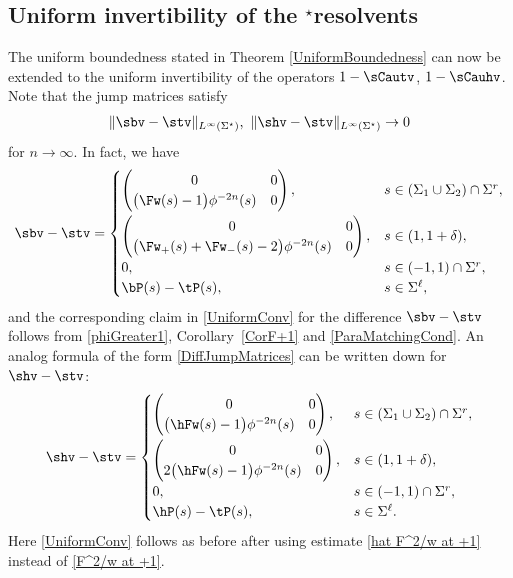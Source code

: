 \subsection[Uniform invertibility of the star resolvents]{Uniform invertibility of the $\boldsymbol{{}^\star}$resolvents}\label{Comparison}
The uniform boundedness stated in Theorem \ref{UniformBoundedness} can now be extended to the uniform invertibility of the operators $1-\sCautv$, $1-\sCauhv$. Note that the jump matrices satisfy
\begin{align}\label{UniformConv}
\Vert \sbv - \stv \Vert_{L^\infty(\Sigma^\star)}, \ \Vert \shv - \stv \Vert_{L^\infty(\Sigma^\star)} \to 0
\end{align}
for $n \to \infty$. In fact, we have
\begin{align}
 \sbv - \stv =
 \begin{cases}
 \begin{pmatrix}
 0 & 0
 \\
 \big(\Fw(s)-1\big)\phi^{-2n}(s) & 0
 \end{pmatrix}, & s\in (\Sigma_1 \cup \Sigma_2)\cap\Sigma^r,\vspace{1mm}
 \\
 \begin{pmatrix}
 0 & 0
 \\
 \big(\Fw_+(s) +\Fw_-(s)-2\big)\phi^{-2n}(s) & 0
 \end{pmatrix}, & s\in (1,1+\delta),
 \\
 0, & s\in(-1,1)\cap \Sigma^r,
 \\
 \bP(s)-\tP(s), & s\in\Sigma^\ell,
 \end{cases}\label{DiffJumpMatrices}
\end{align}
and the corresponding claim in \eqref{UniformConv} for the difference $\sbv - \stv$ follows from \eqref{phiGreater1}, Corollary~\ref{CorF+1} and \eqref{ParaMatchingCond}. An analog formula of the form \eqref{DiffJumpMatrices} can be written down for $\shv - \stv$:
\begin{align*}
 \shv - \stv =
 \begin{cases}
 \begin{pmatrix}
 0 & 0
 \\
 \big(\hFw(s)-1\big)\phi^{-2n}(s) & 0
 \end{pmatrix}, & s\in (\Sigma_1 \cup \Sigma_2)\cap\Sigma^r,\vspace{1mm}
 \\
 \begin{pmatrix}
 0 & 0
 \\
 2\big(\hFw(s)-1\big)\phi^{-2n}(s) & 0
 \end{pmatrix}, & s\in (1,1+\delta),
 \\
 0, & s\in(-1,1)\cap \Sigma^r,
 \\
 \hP(s)-\tP(s), & s\in\Sigma^\ell.
 \end{cases}
\end{align*}
Here \eqref{UniformConv} follows as before after using estimate \eqref{hat F^2/w at +1} instead of \eqref{F^2/w at +1}.

